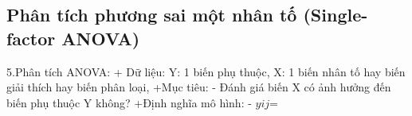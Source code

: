 \subsection{Phân tích phương sai một nhân tố (Single-factor ANOVA)}
5.Phân tích ANOVA:
+ Dữ liệu: 
	Y: 1 biến phụ thuộc,
	X: 1 biến nhân tố hay biến giải thích hay biến phân loại,
+Mục tiêu:
	- Đánh giá biến X có ảnh hưởng đến biến phụ thuộc Y không?
+Định nghĩa mô hình:
	- $y{ij}$=
